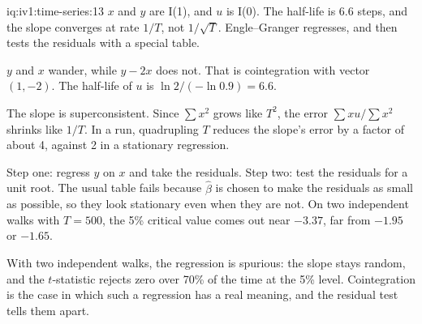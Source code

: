 \begin{solution}{iq:iv1:time-series:13}
$x$ and $y$ are I(1), and $u$ is I(0). The half-life is $6.6$ steps, and the slope converges at rate $1/T$, not $1/\sqrt{T}$. Engle--Granger regresses, and then tests the residuals with a special table.

$y$ and $x$ wander, while $y - 2x$ does not. That is cointegration with vector $(1, -2)$. The half-life of $u$ is $\ln 2/(-\ln 0.9) = 6.6$.

The slope is superconsistent. Since $\sum x^2$ grows like $T^2$, the error $\sum xu/\sum x^2$ shrinks like $1/T$. In a run, quadrupling $T$ reduces the slope's error by a factor of about 4, against 2 in a stationary regression.

Step one: regress $y$ on $x$ and take the residuals. Step two: test the residuals for a unit root. The usual table fails because $\hat{\beta}$ is chosen to make the residuals as small as possible, so they look stationary even when they are not. On two independent walks with $T = 500$, the 5\% critical value comes out near $-3.37$, far from $-1.95$ or $-1.65$.

With two independent walks, the regression is spurious: the slope stays random, and the $t$-statistic rejects zero over 70\% of the time at the 5\% level. Cointegration is the case in which such a regression has a real meaning, and the residual test tells them apart.



\end{solution}

